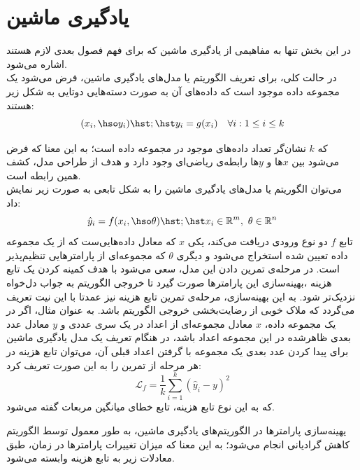 
\section{یادگیری ماشین}
در این بخش تنها به مفاهیمی از یادگیری ماشین که برای فهم فصول بعدی لازم هستند اشاره می‌شود. \\
در حالت کلی، برای تعریف الگوریتم یا مدل‌های یادگیری ماشین، فرض می‌شود یک مجموعه داده موجود است که داده‌های آن به صورت دسته‌هایی دوتایی به شکل زیر هستند:
\begin{equation}
    (x_i, \hso y_i) \hst ; \hst y_i = g(x_i) \quad  \forall i : 1 \leq i \leq k
\end{equation}

که
$k$
نشان‌گر تعداد داده‌های موجود در مجموعه داده است؛
به این معنا که فرض می‌شود بین 
$x$ها
و
$y$ها
رابطه‌ی ریاضی‌ای وجود دارد و هدف از طراحی مدل، کشف همین رابطه است. \\
می‌توان الگوریتم یا مدل‌های یادگیری ماشین را به شکل تابعی به صورت زیر نمایش داد:
\begin{equation}
    \Hat{y}_i = f(x_i, \hso \theta) \hst ; \hst x_i \in \mathbb{R}^m, \hspace{1.2mm} \theta \in \mathbb{R}^n
\end{equation}
تابع
$f$
دو نوع ورودی دریافت می‌کند، یکی
$x$
که معادل داده‌هایی‌ست که از یک مجموعه داده تعیین شده استخراج می‌شود و دیگری
$\theta$
که مجموعه‌ای از پارامترهایی تنظیم‌پذیر است. در مرحله‌ی تمرین دادن
این مدل، سعی می‌شود با هدف کمینه کردن یک تابع هزینه
،بهینه‌سازی این پارامترها صورت گیرد تا خروجی الگوریتم به جواب دل‌خواه نزدیک‌تر شود.
به این بهینه‌سازی، مرحله‌ی تمرین
تابع هزینه نیز عمدتا با این نیت تعریف می‌گردد که ملاک خوبی از رضایت‌بخشی خروجی الگوریتم باشد. به عنوان مثال، اگر در یک مجموعه داده،
$x$
معادل مجموعه‌ای از اعداد در یک سری عددی
و
$y$
معادل عدد بعدی ظاهرشده در این مجموعه اعداد باشد، در هنگام تعریف یک مدل یادگیری ماشین برای پیدا کردن عدد بعدی یک مجموعه با گرفتن اعداد قبلی آن، می‌توان تابع هزینه در هر مرحله از تمرین را به این صورت تعریف کرد:
\begin{equation}
    \mathcal{L}_f = \frac{1}{k} \sum_{i=1}^{k} (\hat{y}_i - y)^2
\end{equation}
که به این نوع تابع هزینه، تابع خطای میانگین مربعات
گفته می‌شود.

یهینه‌سازی پارامترها در الگوریتم‌های یادگیری ماشین، به طور معمول توسط الگوریتم کاهش گرادیانی
انجام می‌شود؛ به این معنا که میزان تغییرات پارامترها در زمان، طبق معادلات زیر به تابع هزینه وابسته می‌شود.

